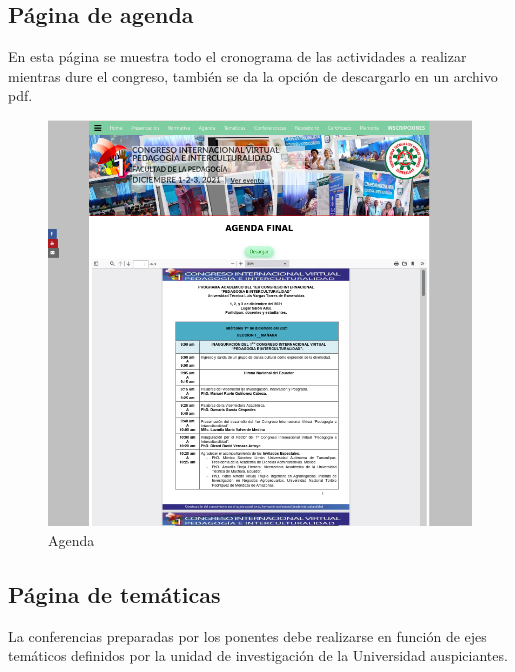 \documentclass[a4paper,14px]{article}
\begin{document}
\newpage
\subsection{Página de agenda }
\label{sec:pagina-principal}

En esta página se muestra todo el cronograma de las actividades a realizar mientras dure el congreso, también se da la opción de descargarlo en un archivo pdf.



\begin{figure}[H]
  \centering
  \includegraphics[scale=0.6]{agenda.png}
  \caption{Agenda}
  \label{fig:arquitectura}
\end{figure}


\newpage
\subsection{Página de temáticas }
\label{sec:pagina-principal}

La conferencias preparadas por los ponentes debe realizarse en función de ejes temáticos definidos por la unidad de investigación de la Universidad auspiciantes.
\end{document}
